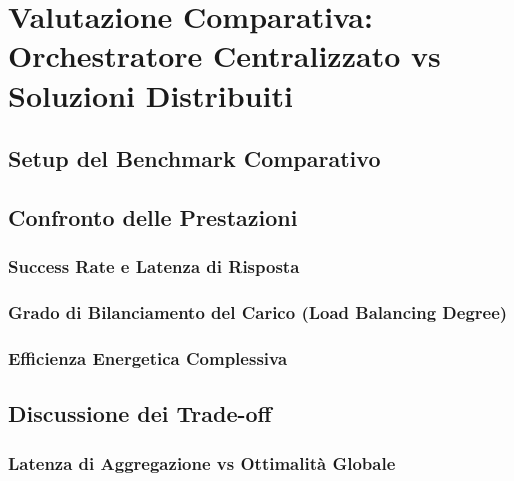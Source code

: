 \chapter{Valutazione Comparativa: Orchestratore Centralizzato vs Soluzioni Distribuiti}
\label{chap:benchmark}

\section{Setup del Benchmark Comparativo}

\section{Confronto delle Prestazioni}
\subsection{Success Rate e Latenza di Risposta}
\subsection{Grado di Bilanciamento del Carico (Load Balancing Degree)}
\subsection{Efficienza Energetica Complessiva}

\section{Discussione dei Trade-off}
\subsection{Latenza di Aggregazione vs Ottimalità Globale}